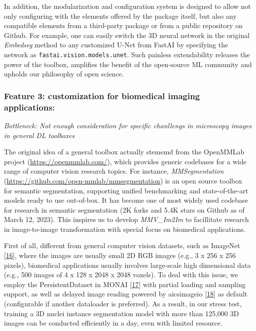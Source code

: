 In addition, the modularization and configuration system is designed to allow not only configuring with the elements offered by the package itself, but also any compatible elements from a third-party package or from a public repository on Github.
For example, one can easily switch the 3D neural network in the original \emph{Embedseg} method to any customized U-Net from FastAI by specifying the network as \texttt{fastai.vision.models.unet}. Such painless extendability releases the power of the toolbox, amplifies the benefit of the open-source ML community and upholds our philosophy of open science.

\hypertarget{feature-3-customization-for-biomedical-imaging-applications}{%
\subsubsection{Feature 3: customization for biomedical imaging applications:}\label{feature-3-customization-for-biomedical-imaging-applications}}

\emph{Bottleneck: Not enough consideration for specific chanllengs in microscopy images in general DL toolboxes}

The original idea of a general toolbox actually stememd from the OpenMMLab project (\url{https://openmmlab.com/}), which provides generic codebases for a wide range of computer vision research topics. For instance, \emph{MMSegmentation} (\url{https://github.com/open-mmlab/mmsegmentation}) is an open source toolbox for semantic segmentation, supporting unified benchmarking and state-of-the-art models ready to use out-of-box.
It has become one of most widely used codebase for research in semantic segmentation (2K forks and 5.4K stars on Github as of March 12, 2023).
This inspires us to develop \emph{MMV\_Im2Im} to facillitate research in image-to-image transformation with special focus on biomedical applications.

First of all, different from general computer vision datasets, such as ImageNet {[}\protect\hyperlink{ref-lt4BNUoG}{16}{]}, where the images are usually small 2D RGB images (e.g., 3 x 256 x 256 pixels), biomedical applications usually involves large-scale high dimensional data (e.g., 500 images of 4 x 128 x 2048 x 2048 voxels). To deal with this issue, we employ the PersistentDataset in MONAI {[}\protect\hyperlink{ref-UU62HYC6}{17}{]} with partial loading and sampling support, as well as delayed image reading powered by aicsimageio {[}\protect\hyperlink{ref-gsfWGJKf}{18}{]} as default (configurable if another dataloader is preferred).
As a result, in our stress test, training a 3D nuclei instance segmentation model with more than 125,000 3D images can be conducted efficiently in a day, even with limited resource.

